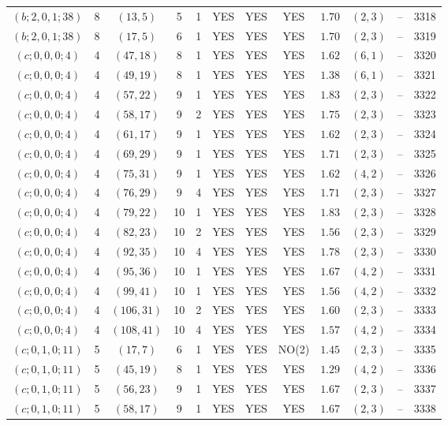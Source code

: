 \begin{longtable}{|c|c|c|c|c|c|c|c|c|c|c|c|}
$(b;2,0,1;38)$ & 8 & $(13,5)$ & 5 & 1 & YES & YES & YES & $1.70$ & $(2,3)$ & -- & 3318\\
$(b;2,0,1;38)$ & 8 & $(17,5)$ & 6 & 1 & YES & YES & YES & $1.70$ & $(2,3)$ & -- & 3319\\
$(c;0,0,0;4)$ & 4 & $(47,18)$ & 8 & 1 & YES & YES & YES & $1.62$ & $(6,1)$ & -- & 3320\\
$(c;0,0,0;4)$ & 4 & $(49,19)$ & 8 & 1 & YES & YES & YES & $1.38$ & $(6,1)$ & -- & 3321\\
$(c;0,0,0;4)$ & 4 & $(57,22)$ & 9 & 1 & YES & YES & YES & $1.83$ & $(2,3)$ & -- & 3322\\
$(c;0,0,0;4)$ & 4 & $(58,17)$ & 9 & 2 & YES & YES & YES & $1.75$ & $(2,3)$ & -- & 3323\\
$(c;0,0,0;4)$ & 4 & $(61,17)$ & 9 & 1 & YES & YES & YES & $1.62$ & $(2,3)$ & -- & 3324\\
$(c;0,0,0;4)$ & 4 & $(69,29)$ & 9 & 1 & YES & YES & YES & $1.71$ & $(2,3)$ & -- & 3325\\
$(c;0,0,0;4)$ & 4 & $(75,31)$ & 9 & 1 & YES & YES & YES & $1.62$ & $(4,2)$ & -- & 3326\\
$(c;0,0,0;4)$ & 4 & $(76,29)$ & 9 & 4 & YES & YES & YES & $1.71$ & $(2,3)$ & -- & 3327\\
$(c;0,0,0;4)$ & 4 & $(79,22)$ & 10 & 1 & YES & YES & YES & $1.83$ & $(2,3)$ & -- & 3328\\
$(c;0,0,0;4)$ & 4 & $(82,23)$ & 10 & 2 & YES & YES & YES & $1.56$ & $(2,3)$ & -- & 3329\\
$(c;0,0,0;4)$ & 4 & $(92,35)$ & 10 & 4 & YES & YES & YES & $1.78$ & $(2,3)$ & -- & 3330\\
$(c;0,0,0;4)$ & 4 & $(95,36)$ & 10 & 1 & YES & YES & YES & $1.67$ & $(4,2)$ & -- & 3331\\
$(c;0,0,0;4)$ & 4 & $(99,41)$ & 10 & 1 & YES & YES & YES & $1.56$ & $(4,2)$ & -- & 3332\\
$(c;0,0,0;4)$ & 4 & $(106,31)$ & 10 & 2 & YES & YES & YES & $1.60$ & $(2,3)$ & -- & 3333\\
$(c;0,0,0;4)$ & 4 & $(108,41)$ & 10 & 4 & YES & YES & YES & $1.57$ & $(4,2)$ & -- & 3334\\
$(c;0,1,0;11)$ & 5 & $(17,7)$ & 6 & 1 & YES & YES & NO(2) & $1.45$ & $(2,3)$ & -- & 3335\\
$(c;0,1,0;11)$ & 5 & $(45,19)$ & 8 & 1 & YES & YES & YES & $1.29$ & $(4,2)$ & -- & 3336\\
$(c;0,1,0;11)$ & 5 & $(56,23)$ & 9 & 1 & YES & YES & YES & $1.67$ & $(2,3)$ & -- & 3337\\
$(c;0,1,0;11)$ & 5 & $(58,17)$ & 9 & 1 & YES & YES & YES & $1.67$ & $(2,3)$ & -- & 3338\\

\end{longtable}
